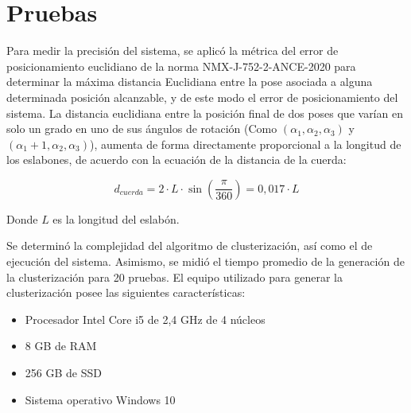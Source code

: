 \section{Pruebas}

Para medir la precisión del sistema, se aplicó la métrica del error de posicionamiento euclidiano de la norma NMX-J-752-2-ANCE-2020 para determinar la máxima distancia Euclidiana entre la pose asociada a alguna determinada posición alcanzable, y de este modo el error de posicionamiento del sistema. La distancia euclidiana entre la posición final de dos poses que varían en solo un grado en uno de sus ángulos de rotación (Como $(\alpha_1,\alpha_2,\alpha_3)$ y $(\alpha_1 + 1, \alpha_2, \alpha_3)$), aumenta de forma directamente proporcional a la longitud de los eslabones, de acuerdo con la ecuación de la distancia de la cuerda:

\begin{equation}
	d_{cuerda} = 2 \cdot L \cdot \sin(\frac{\pi}{360}) = 0,017 \cdot L
\end{equation}

Donde $L$ es la longitud del eslabón.

Se determinó la complejidad del algoritmo de clusterización, así como el de ejecución del sistema. Asimismo, se midió el tiempo promedio de la generación de la clusterización para 20 pruebas. El equipo utilizado para generar la clusterización posee las siguientes características:

\begin{itemize}
	\item Procesador Intel Core i5 de 2,4 GHz de 4 núcleos
	\item 8 GB de RAM
	\item 256 GB de SSD
	\item Sistema operativo Windows 10
\end{itemize}


